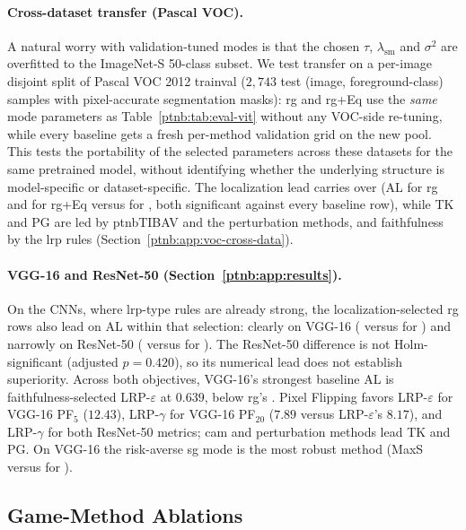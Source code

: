 \paragraph{Cross-dataset transfer (Pascal VOC).}
A natural worry with validation-tuned modes is that the chosen $\tau$, $\lambda_{\mathrm{sm}}$ and
$\sigma^2$ are overfitted to the ImageNet-S 50-class subset. We test transfer on a per-image
disjoint split of Pascal VOC 2012 trainval ($2{,}743$ test (image, foreground-class) samples with
pixel-accurate segmentation masks): \ac{rg} and \ac{rg}+Eq use the \emph{same} mode parameters as
Table~\ref{ptnb:tab:eval-vit} without any VOC-side re-tuning, while every baseline gets a fresh
per-method validation grid on the new pool. This tests the portability of the selected parameters
across these datasets for the same pretrained model, without identifying whether the underlying
structure is model-specific or dataset-specific. The localization lead carries over (AL
\vocRGlocAL{} for \ac{rg} and \vocRGEqlocAL{} for \ac{rg}+Eq versus \vocBestBaseAL{} for
\vocBestBaseALname{}, both significant against every baseline row), while TK and PG are led by
\ac{ptnbTIBAV} and the perturbation methods, and faithfulness by the \ac{lrp} rules
(Section~\ref{ptnb:app:voc-cross-data}).

\paragraph{VGG-16 and ResNet-50 (Section~\ref{ptnb:app:results}).}
On the CNNs, where \ac{lrp}-type rules are already strong, the localization-selected \ac{rg} rows also lead on AL within that selection: clearly on VGG-16 (\vggRGlocAL{} versus \vggBestBaseAL{} for \vggBestBaseALname{}) and narrowly on ResNet-50 (\resRGlocAL{} versus \resBestBaseAL{} for \resBestBaseALname{}). The ResNet-50 difference is not Holm-significant (adjusted $p=0.420$), so its numerical lead does not establish superiority. Across both objectives, VGG-16's strongest baseline AL is faithfulness-selected LRP-$\varepsilon$ at $0.639$, below \ac{rg}'s \vggRGlocAL{}. Pixel Flipping favors LRP-$\varepsilon$ for VGG-16 PF$_5$ ($12.43$), LRP-$\gamma$ for VGG-16 PF$_{20}$ ($7.89$ versus LRP-$\varepsilon$'s $8.17$), and LRP-$\gamma$ for both ResNet-50 metrics; \ac{cam} and perturbation methods lead TK and PG. On VGG-16 the risk-averse \ac{sg} mode is the most robust method (MaxS \vggSGlocMaxS{} versus \vggBestBaseMaxS{} for \vggBestBaseMaxSname{}).

\subsection{Game-Method Ablations}\label{subsec:mode_ablation}

